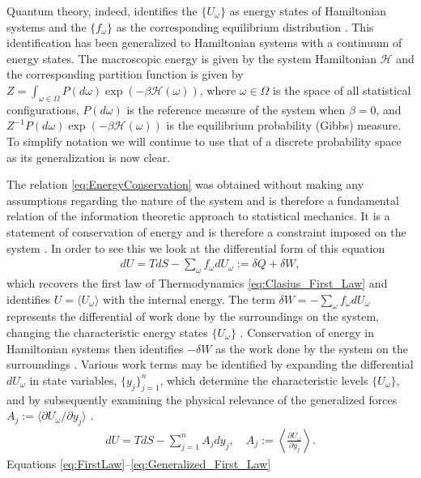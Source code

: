 \documentclass[english,12pt]{ttuthes}
\newcommand{\Hc}{\mathcal{H}}
\begin{document}
Quantum theory, indeed, identifies the $\{U_\omega\}$ as energy states of Hamiltonian
systems and the $\{f_\omega\}$ as the corresponding equilibrium distribution
\cite{Robertson-1993}. This identification has been generalized to
Hamiltonian systems with a continuum of energy states. The macroscopic
energy is given by the system Hamiltonian $\Hc$ and the
corresponding partition function is given by
$Z=\int_{\omega\in\Omega}P(d\omega)\exp{(-\beta\Hc(\omega))}$, where $\omega\in\Omega$ is the space of
all statistical configurations, $P(d\omega)$ is the reference measure of
the system when $\beta=0$, and $Z^{-1}P(d\omega)\exp{(-\beta\Hc(\omega))}$ is
the equilibrium probability (Gibbs) measure. To simplify notation we
will continue to use that of a discrete probability space as its
generalization is now clear.  

The relation \eqref{eq:EnergyConservation} was obtained without making
any assumptions regarding the nature of the system and is therefore a
fundamental relation of the information theoretic approach to
statistical mechanics. It is a statement of conservation of energy and
is therefore a constraint imposed on the system \cite{Bobbio-2000}. In
order to see this we look at the differential form of this equation
\cite{Robertson-1993}   
%
\begin{align}\label{eq:FirstLaw} 
 dU=TdS-\sum_\omega f_\omega dU_\omega:=\delta Q+\delta W,
\end{align}
%
which recovers the first law of Thermodynamics
\eqref{eq:Clasius_First_Law} and identifies $U=\langle U_\omega\rangle$ with the
internal energy. The term $\delta W=-\sum_\omega f_\omega dU_\omega$ represents the
differential of work done by the surroundings on the 
system, changing the characteristic energy states $\{U_\omega\}$
\cite{Robertson-1993}. Conservation of energy in Hamiltonian systems
then identifies $-\delta W$ as the work done by the system on the
surroundings \cite{Thompson-1988,Baker-1990}. Various work terms may
be identified by expanding the differential $dU_\omega$ in state variables,
$\{y_j\}_{j=1}^n$, which determine the characteristic levels
$\{U_\omega\}$, and by subsequently examining the physical relevance of the
generalized forces $A_j:=\langle\partial U_\omega/\partial y_j\rangle$ \cite{Robertson-1993}.
%
\begin{align}\label{eq:Generalized_First_Law}
  dU=TdS-\sum_{j=1}^nA_jdy_j, \quad  A_j:=\left\langle\frac{\partial U_\omega}{\partial y_j}\right\rangle.
\end{align}
%
Equations \eqref{eq:FirstLaw}--\eqref{eq:Generalized_First_Law}
\end{document}
